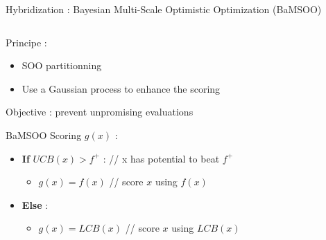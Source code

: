 \begin{frame}{Hybridization : Bayesian Multi-Scale Optimistic Optimization (BaMSOO)}
    \begin{columns}
        \begin{column}{0.55\textwidth}
            \begin{block}{Principe :}
                \begin{itemize}
                    \item SOO partitionning
                    \item Use a Gaussian process to enhance the scoring
                \end{itemize}
                Objective : prevent unpromising evaluations
                
            \end{block}
            
            \begin{block}{BaMSOO Scoring $g(x)$ :}
                \begin{itemize}
                    \item \textbf{If} $UCB(x) > f^+$ : {\color{gray} // \small x has potential to beat $f^+$}
                        \begin{itemize}
                            \item $g(x) = f(x)$ {\color{gray} // \small score $x$ using $f(x)$}
                        \end{itemize}
                    \item \textbf{Else } :
                        \begin{itemize}
                            \item $g(x) = LCB(x)$ {\color{gray} // \small score $x$ using $LCB(x)$}
                        \end{itemize}


                \end{itemize}
                
            \end{block}
            
        \end{column}        
        \begin{column}{0.45\textwidth}
            \begin{figure}[h]
                \centering
                
            \end{figure}
        \end{column}
    \end{columns}
\end{frame}